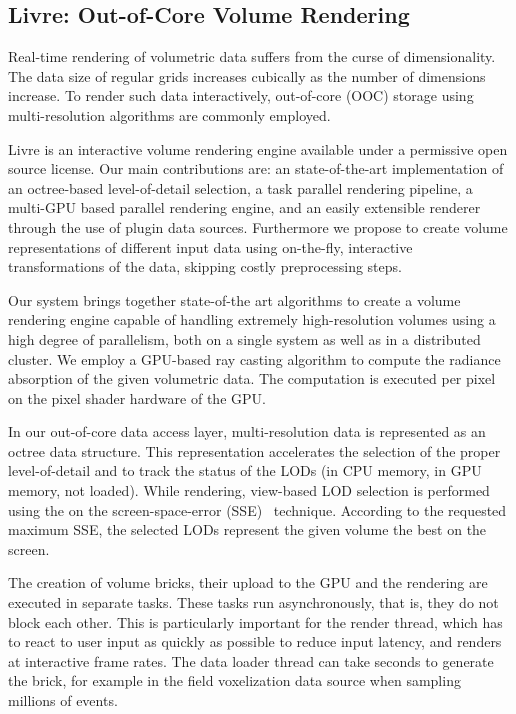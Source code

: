 \documentclass[10pt]{llncs}
\begin{document}
\subsection{Livre: Out-of-Core Volume Rendering}

Real-time rendering of volumetric data suffers from the curse of
dimensionality. The data size of regular grids increases cubically as the number
of dimensions increase. To render such data interactively, out-of-core (OOC)
storage using multi-resolution algorithms are commonly employed.

Livre is an interactive volume rendering engine available under a permissive
open source license. Our main contributions are: an state-of-the-art
implementation of an octree-based level-of-detail selection, a task parallel
rendering pipeline, a multi-GPU based parallel rendering engine, and an easily
extensible renderer through the use of plugin data sources. Furthermore we
propose to create volume representations of different input data using
on-the-fly, interactive transformations of the data, skipping costly
preprocessing steps.

Our system brings together state-of-the art algorithms to create a volume
rendering engine capable of handling extremely high-resolution volumes using a
high degree of parallelism, both on a single system as well as in a distributed
cluster. We employ a GPU-based ray casting algorithm to compute the radiance
absorption of the given volumetric data. The computation is executed per pixel
on the pixel shader hardware of the GPU.

In our out-of-core data access layer, multi-resolution data is represented as an
octree data structure. This representation accelerates the selection of the
proper level-of-detail and to track the status of the LODs (in CPU memory, in
GPU memory, not loaded). While rendering, view-based LOD selection is performed
using the on the screen-space-error (SSE)~\cite{guthe2004} technique. According
to the requested maximum SSE, the selected LODs represent the given volume the
best on the screen.

The creation of volume bricks, their upload to the GPU and the rendering are
executed in separate tasks. These tasks run asynchronously, that is, they do not
block each other. This is particularly important for the render thread, which
has to react to user input as quickly as possible to reduce input latency, and
renders at interactive frame rates. The data loader thread can take seconds to
generate the brick, for example in the field voxelization data source when
sampling millions of events.
\end{document}
